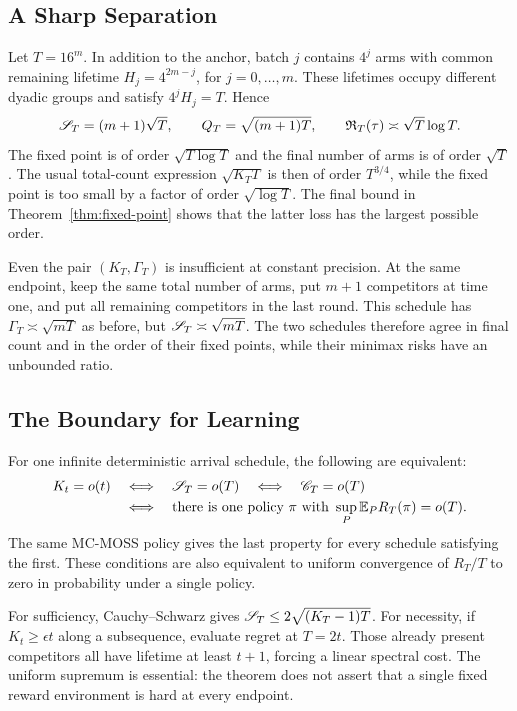 \subsection{A Sharp Separation}
Let $T=16^m$. In addition to the anchor, batch $j$ contains $4^j$ arms with common remaining lifetime $H_j=4^{2m-j}$, for $j=0,\ldots,m$. These lifetimes occupy different dyadic groups and satisfy $4^jH_j=T$. Hence
\begin{equation}\label{eq:separation}
 \mathscr S_T=(m+1)\sqrt T,\qquad Q_T=\sqrt{(m+1)T},
 \qquad \mathfrak R_T(\tau)\asymp\sqrt T\log T.
\end{equation}
The fixed point is of order $\sqrt{T\log T}$ and the final number of arms is of order $\sqrt T$. The usual total-count expression $\sqrt{K_TT}$ is then of order $T^{3/4}$, while the fixed point is too small by a factor of order $\sqrt{\log T}$. The final bound in Theorem~\ref{thm:fixed-point} shows that the latter loss has the largest possible order.

Even the pair $(K_T,\Gamma_T)$ is insufficient at constant precision. At the same endpoint, keep the same total number of arms, put $m+1$ competitors at time one, and put all remaining competitors in the last round. This schedule has $\Gamma_T\asymp\sqrt{mT}$ as before, but $\mathscr S_T\asymp\sqrt{mT}$. The two schedules therefore agree in final count and in the order of their fixed points, while their minimax risks have an unbounded ratio.

\subsection{The Boundary for Learning}
\begin{theorem}\label{thm:learning}
For one infinite deterministic arrival schedule, the following are equivalent:
\begin{align*}
 K_t=o(t)\quad&\Longleftrightarrow\quad\mathscr S_T=o(T)
 \quad\Longleftrightarrow\quad\mathscr C_T=o(T)\\
 &\Longleftrightarrow\quad
 \text{there is one policy }\pi\text{ with }\sup_P\mathbb E_P R_T(\pi)=o(T).
\end{align*}
The same MC-MOSS policy gives the last property for every schedule satisfying the first. These conditions are also equivalent to uniform convergence of $R_T/T$ to zero in probability under a single policy.
\end{theorem}

For sufficiency, Cauchy--Schwarz gives $\mathscr S_T\le2\sqrt{(K_T-1)T}$. For necessity, if $K_t\ge\epsilon t$ along a subsequence, evaluate regret at $T=2t$. Those already present competitors all have lifetime at least $t+1$, forcing a linear spectral cost. The uniform supremum is essential: the theorem does not assert that a single fixed reward environment is hard at every endpoint.

